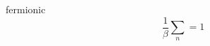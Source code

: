 \documentclass{article}
\begin{document}
fermionic
\begin{equation} \frac{1}{\beta}\sum_n = 1 \end{equation}
\end{document}
